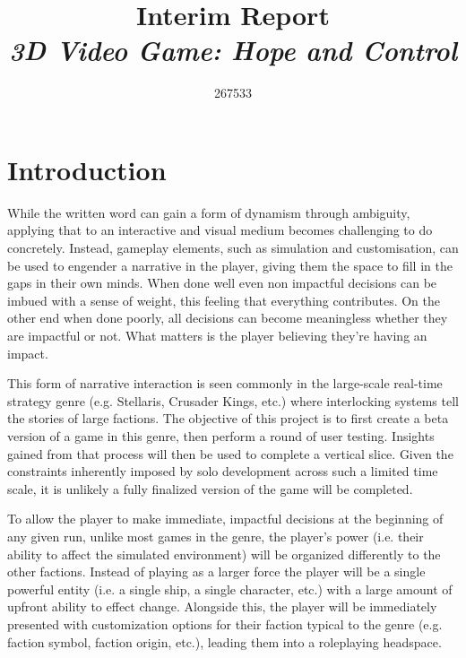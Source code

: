 \documentclass{report}
\begin{document}
\title{Interim Report \\
\textit{3D Video Game: Hope and Control}}
\author{267533}

\maketitle

\chapter{Introduction}
While the written word can gain a form of dynamism through ambiguity, applying that to an interactive and visual medium becomes challenging to do concretely. Instead, gameplay elements, such as simulation and customisation, can be used to engender a narrative in the player, giving them the space to fill in the gaps in their own minds. When done well even non impactful decisions can be imbued with a sense of weight, this feeling that everything contributes. On the other end when done poorly, all decisions can become meaningless whether they are impactful or not. What matters is the player believing they're having an impact. 

This form of narrative interaction is seen commonly in the large-scale real-time strategy genre (e.g. Stellaris, Crusader Kings, etc.) where interlocking systems tell the stories of large factions. The objective of this project is to first create a beta version of a game in this genre, then perform a round of user testing. Insights gained from that process will then be used to complete a vertical slice. Given the constraints inherently imposed by solo development across such a limited time scale, it is unlikely a fully finalized version of the game will be completed.

To allow the player to make immediate, impactful decisions at the beginning of any given run, unlike most games in the genre, the player's power (i.e. their ability to affect the simulated environment) will be organized differently to the other factions. Instead of playing as a larger force the player will be a single powerful entity (i.e. a single ship, a single character, etc.) with a large amount of upfront ability to effect change. Alongside this, the player will be immediately presented with customization options for their faction typical to the genre (e.g. faction symbol, faction origin, etc.), leading them into a roleplaying headspace. 
\end{document}
